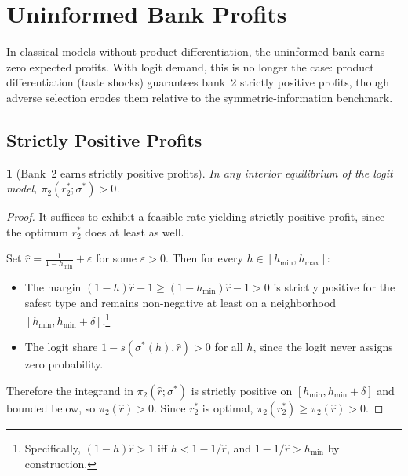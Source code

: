 \documentclass[12pt]{article}
\theoremstyle{plain}
\theoremstyle{plain}
\newtheorem{prop}[thm]{\protect\propositionname}
\theoremstyle{definition}  %
\theoremstyle{remark}  %
\providecommand{\propositionname}{Proposition}
\begin{document}

\section{Uninformed Bank Profits}\label{sec:bank2profits}

In classical models without product differentiation, the uninformed bank earns zero expected profits. With logit demand, this is no longer the case: product differentiation (taste shocks) guarantees bank~2 strictly positive profits, though adverse selection erodes them relative to the symmetric-information benchmark.

\subsection{Strictly Positive Profits}

\begin{prop}[Bank~2 earns strictly positive profits]\label{prop:b2positive}
In any interior equilibrium of the logit model, $\pi_2(r_2^*; \sigma^*) > 0$.
\end{prop}

\begin{proof}
It suffices to exhibit a feasible rate yielding strictly positive profit, since the optimum $r_2^*$ does at least as well.

Set $\hat{r} = \frac{1}{1 - h_{\min}} + \varepsilon$ for some $\varepsilon > 0$. Then for every $h \in [h_{\min}, h_{\max}]$:
\begin{itemize}
    \item The margin $(1-h)\hat{r} - 1 \geq (1-h_{\min})\hat{r} - 1 > 0$ is strictly positive for the safest type and remains non-negative at least on a neighborhood $[h_{\min}, h_{\min} + \delta]$.\footnote{Specifically, $(1-h)\hat{r} > 1$ iff $h < 1 - 1/\hat{r}$, and $1 - 1/\hat{r} > h_{\min}$ by construction.}
    \item The logit share $1 - s(\sigma^*(h), \hat{r}) > 0$ for all $h$, since the logit never assigns zero probability.
\end{itemize}
Therefore the integrand in $\pi_2(\hat{r}; \sigma^*)$ is strictly positive on $[h_{\min}, h_{\min} + \delta]$ and bounded below, so $\pi_2(\hat{r}) > 0$. Since $r_2^*$ is optimal, $\pi_2(r_2^*) \geq \pi_2(\hat{r}) > 0$.
\end{proof}
\end{document}
